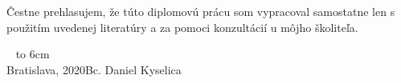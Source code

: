 \documentclass[12pt, a4paper, oneside]{book}
\newcommand\mfauthor{Bc. Daniel Kyselica}
\newcommand\mfplacedate{Bratislava, 2020}
\begin{document}
\thispagestyle{empty}


\begin{figure}[H]
\begin{center}
\label{img:zadanie}
\end{center}
\end{figure}

{~}\vspace{12cm}

\noindent
\begin{minipage}{0.25\textwidth}~\end{minipage}
\begin{minipage}{0.75\textwidth}
Čestne prehlasujem, že túto diplomovú prácu som vypracoval samostatne len s použitím uvedenej literatúry a za pomoci konzultácií u môjho školiteľa.
\newline \newline
\end{minipage}
\vfill
~ \hfill {\hbox to 6cm{\dotfill}} \\
\mfplacedate \hfill \mfauthor
\vfill\eject 
\end{document}
